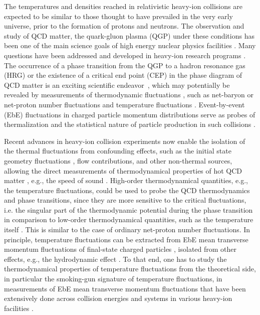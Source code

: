 \documentclass[aps,twocolumn,prd,superscriptaddress,nofootinbib,floatfix]{revtex4-2}
\begin{document}
The temperatures and densities reached in relativistic heavy-ion collisions are expected to be similar to those thought to have prevailed in the very early universe, prior to the formation of protons and neutrons. The observation and study of QCD matter, the quark-gluon plasma (QGP) under these conditions has been one of the main science goals of high energy nuclear physics facilities \cite{Shuryak:1980tp, Harris:1996zx, STAR:2005gfr, PHENIX:2004vcz, ALICE:2005vhb, Busza:2018rrf, STAR:2023jdd}. Many questions have been addressed and developed in heavy-ion research programs \cite{Busza:2018rrf}. The occurrence of a phase transition from the QGP to a hadron resonance gas (HRG) or the existence of a critical end point (CEP) in the phase diagram of QCD matter is an exciting scientific endeavor~\cite{Stephanov:1998dy, Stephanov:1999zu, Fu:2019hdw, Gao:2020fbl, Gunkel:2021oya}, which may potentially be revealed by measurements of thermodynamic fluctuations \cite{STAR:2010vob, Bzdak:2019pkr, Chen:2024aom}, such as net-baryon or net-proton number fluctuations \cite{STAR:2020tga, STAR:2021fge, STAR:2022vlo,STAR:2022etb, STAR:2025zdq, Fu:2016tey, Fu:2021oaw, Fu:2023lcm, Lu:2025cls} and temperature fluctuations \cite{Gavin:2003cb,Cao:2021zhy}. Event-by-event (EbE) fluctuations in charged particle momentum distributions serve as probes of thermalization and the statistical nature of particle production in such collisions \cite{Heiselberg:2000fk, Jeon:2000wg, Voloshin:1999yf, Asakawa:2000wh,Stodolsky:1995ds}.  

Recent advances in heavy-ion collision experiments now enable the isolation of the thermal fluctuations from confounding effects, such as the initial state geometry fluctuations \cite{Gardim:2011xv,Schenke:2014tga, STAR:2024wgy,ATLAS:2024jvf,Zhang:2025yyd,STAR:2025elk}, flow contributions, and other non-thermal sources, allowing the direct measurements of thermodynamical properties of hot QCD matter \cite{Gardim:2019xjs}, e.g., the speed of sound \cite{Gardim:2019brr, Gardim:2024zvi, CMS:2024sgx, Mu:2025gtr}. High-order thermodynamical quantities, e.g., the temperature fluctuations, could be used to probe the QCD thermodynamics and phase transitions, since they are more sensitive to the critical fluctuations, i.e. the singular part of the thermodynamic potential during the phase transition in comparison to low-order thermodynamical quantities, such as the temperature itself \cite{NA60:2008dcb, HADES:2019auv, Churchill:2023zkk, STAR:2024bpc, Chen:2026gka}. This is similar to the case of ordinary net-proton number fluctuations. In principle, temperature fluctuations can be extracted from EbE mean transverse momentum fluctuations of final-state charged particles \cite{Gavin:2003cb}, isolated from other effects, e.g., the hydrodynamic effect \cite{Giacalone:2020lbm}. To that end, one has to study the thermodynamical properties of temperature fluctuations from the theoretical side, in particular the smoking-gun signature of temperature fluctuations, in measurements of EbE mean transverse momentum fluctuations that have been extensively done across collision energies and systems in various heavy-ion facilities \cite{NA49:1999inh, CERES:2003sap, PHENIX:2003ccl, STAR:2005vxr, NA49:2008fag, ALICE:2023tej, ATLAS:2024jvf}. 
 
\end{document}
